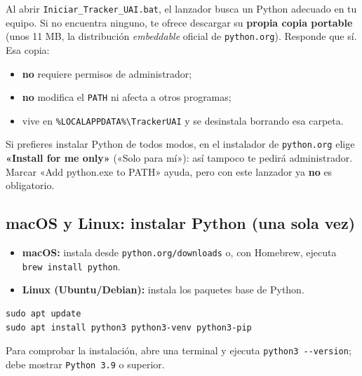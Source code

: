 \documentclass[11pt,a4paper]{article}
\begin{document}
Al abrir \texttt{Iniciar\_Tracker\_UAI.bat}, el lanzador busca un Python
adecuado en tu equipo. Si no encuentra ninguno, te ofrece descargar su
\textbf{propia copia portable} (unos 11 MB, la distribución
\emph{embeddable} oficial de \texttt{python.org}). Responde que sí. Esa copia:

\begin{itemize}
  \item \textbf{no} requiere permisos de administrador;
  \item \textbf{no} modifica el \texttt{PATH} ni afecta a otros programas;
  \item vive en \texttt{\%LOCALAPPDATA\%\textbackslash TrackerUAI} y se
    desinstala borrando esa carpeta.
\end{itemize}

\begin{obs}
  Si prefieres instalar Python de todos modos, en el instalador de
  \texttt{python.org} elige \textbf{«Install for me only»} («Solo para mí»):
  así tampoco te pedirá administrador. Marcar «Add python.exe to PATH» ayuda,
  pero con este lanzador ya \textbf{no} es obligatorio.
\end{obs}

\subsection{macOS y Linux: instalar Python (una sola vez)}

\begin{receta}
  \begin{itemize}
    \item \textbf{macOS:} instala desde \texttt{python.org/downloads} o, con
      Homebrew, ejecuta \texttt{brew install python}.
    \item \textbf{Linux (Ubuntu/Debian):} instala los paquetes base de Python.
  \end{itemize}
\end{receta}

\begin{lstlisting}[caption={Linux: instalación de Python (terminal).}]
sudo apt update
sudo apt install python3 python3-venv python3-pip
\end{lstlisting}

Para comprobar la instalación, abre una terminal y ejecuta
\texttt{python3 -{}-version}; debe mostrar \texttt{Python 3.9} o superior.

\end{document}
